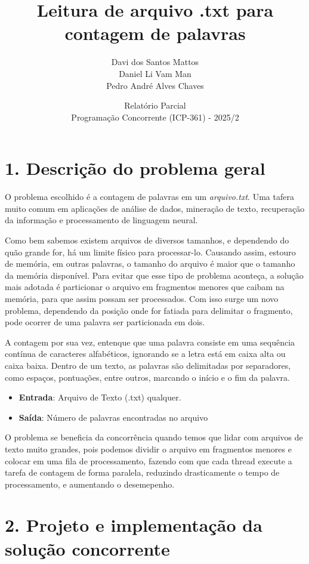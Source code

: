 \documentclass{article}
\title{Leitura de arquivo .txt para contagem de palavras}
\author{Davi dos Santos Mattos \\
        Daniel Li Vam Man \\
        Pedro André Alves Chaves}
\date{Relatório Parcial \\ Programação Concorrente (ICP-361) - 2025/2}
\begin{document}
\maketitle

\section*{1. Descrição do problema geral}

O problema escolhido é a contagem de palavras em um \textit{arquivo.txt}. Uma tafera muito comum em aplicações de análise de dados, mineração de texto, recuperação da informação e processamento de linguagem neural.

Como bem sabemos existem arquivos de diversos tamanhos, e dependendo do quão grande for, há um limite físico para processar-lo. Causando assim, estouro de memória, em outras palavras, o tamanho do arquivo é maior que o tamanho da memória disponível. Para evitar que esse tipo de problema aconteça, a solução mais adotada é particionar o arquivo em fragmentos menores que caibam na memória, para que assim possam ser processados. Com isso surge um novo problema, dependendo da posição onde for fatiada para delimitar o fragmento, pode ocorrer de uma palavra ser particionada em dois.

A contagem por sua vez, entenque que uma palavra consiste em uma sequência contínua de caracteres alfabéticos, ignorando se a letra está em caixa alta ou caixa baixa. Dentro de um texto, as palavras são delimitadas por separadores, como espaços, pontuações, entre outros, marcando o início e o fim da palavra.

\begin{itemize}
    \item \textbf{Entrada}: Arquivo de Texto (.txt) qualquer.
    \item \textbf{Saída}: Número de palavras encontradas no arquivo
\end{itemize}

O problema se beneficia da concorrência quando temos que lidar com arquivos de texto muito grandes, pois podemos dividir o arquivo em fragmentos menores e colocar em uma fila de processamento, fazendo com que cada thread execute a tarefa de contagem de forma paralela, reduzindo drasticamente o tempo de processamento, e aumentando o desemepenho.


\section*{2. Projeto e implementação da solução concorrente}
\end{document}
